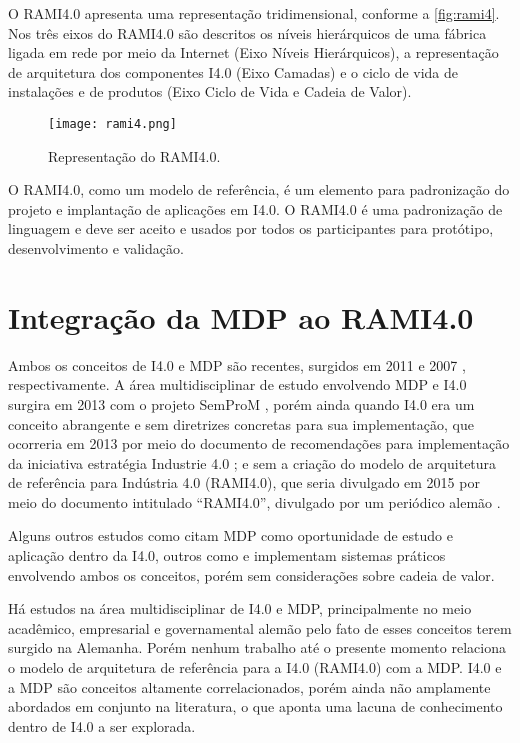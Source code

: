 O RAMI4.0 apresenta uma representação tridimensional, conforme a \autoref{fig:rami4}. Nos três eixos do RAMI4.0 são descritos os níveis hierárquicos de uma fábrica ligada em rede por meio da Internet (Eixo Níveis Hierárquicos), a representação de arquitetura dos componentes I4.0 (Eixo Camadas) e o ciclo de vida de instalações e de produtos (Eixo Ciclo de Vida e Cadeia de Valor).

\begin{figure}[htb]
	\centering
	\texttt{[image: rami4.png]}
	\caption{Representação do RAMI4.0.}
	\label{fig:rami4}
\end{figure}

O RAMI4.0, como um modelo de referência, é um elemento para padronização do projeto e implantação de aplicações em I4.0. O RAMI4.0 é uma padronização de linguagem e deve ser aceito e usados por todos os participantes para protótipo, desenvolvimento e validação.

\section{Integração da MDP ao RAMI4.0}

Ambos os conceitos de I4.0 e MDP são recentes, surgidos em 2011 \cite{kagermann2011industrie} e 2007 \cite{wahlster2007digitalmemory}, respectivamente. A área multidisciplinar de estudo envolvendo MDP e I4.0 surgira em 2013 com o projeto SemProM \cite{wahlster2013semprom}, porém ainda quando I4.0 era um conceito abrangente e sem diretrizes concretas para sua implementação, que ocorreria em 2013 por meio do documento de recomendações para implementação da iniciativa estratégia Industrie 4.0 \cite{kagermann2013recommendations}; e sem a criação do modelo de arquitetura de referência para Indústria 4.0 (RAMI4.0), que seria divulgado em 2015 por meio do documento intitulado ``RAMI4.0'', divulgado por um periódico alemão \cite{hankel2015rami}.

Alguns outros estudos como  citam MDP como oportunidade de estudo e aplicação dentro da I4.0, outros como  e  implementam sistemas práticos envolvendo ambos os conceitos, porém sem considerações sobre cadeia de valor.

Há estudos na área multidisciplinar de I4.0 e MDP, principalmente no meio acadêmico, empresarial e governamental alemão pelo fato de esses conceitos terem surgido na Alemanha. Porém nenhum trabalho até o presente momento relaciona o modelo de arquitetura de referência para a I4.0 (RAMI4.0) com a MDP. I4.0 e a MDP são conceitos altamente correlacionados, porém ainda não amplamente abordados em conjunto na literatura, o que aponta uma lacuna de conhecimento dentro de I4.0 a ser explorada.

